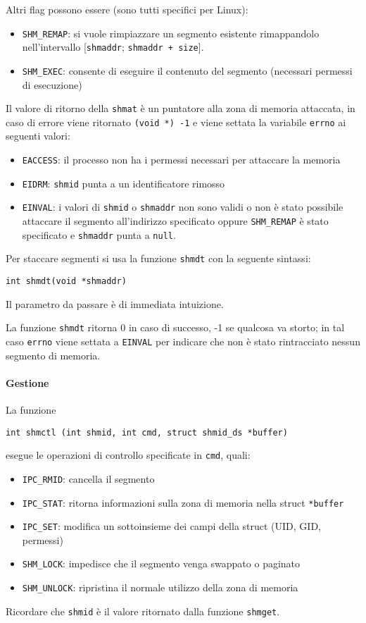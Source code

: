 \documentclass[a4paper, 10pt]{article}
\begin{document}
Altri flag possono essere (sono tutti specifici per Linux):
\begin{itemize}
\item \verb|SHM_REMAP|: si vuole rimpiazzare un segmento esistente rimappandolo nell'intervallo [\verb|shmaddr|; \verb|shmaddr + size|].
\item \verb|SHM_EXEC|: consente di eseguire il contenuto del segmento (necessari permessi di esecuzione)
\end{itemize}

Il valore di ritorno della \verb|shmat| è un puntatore alla zona di memoria attaccata, in caso di errore viene ritornato \verb|(void *) -1| e viene settata la variabile \verb|errno| ai seguenti valori:
\begin{itemize}
\item \verb|EACCESS|: il processo non ha i permessi necessari per attaccare la memoria
\item \verb|EIDRM|: \verb|shmid| punta a un identificatore rimosso
\item \verb|EINVAL|: i valori di \verb|shmid| o \verb|shmaddr| non sono validi o non è stato possibile attaccare il segmento all'indirizzo specificato oppure \verb|SHM_REMAP| è stato specificato e \verb|shmaddr| punta a \verb|null|.
\end{itemize}

Per staccare segmenti si usa la funzione \verb|shmdt| con la seguente sintassi:
\begin{verbatim}
int shmdt(void *shmaddr)
\end{verbatim}
Il parametro da passare è di immediata intuizione.

La funzione \verb|shmdt| ritorna 0 in caso di successo, -1 se qualcosa va storto; in tal caso \verb|errno| viene settata a \verb|EINVAL| per indicare che non è stato rintracciato nessun segmento di memoria.

\paragraph{Gestione}
La funzione
\begin{verbatim}
int shmctl (int shmid, int cmd, struct shmid_ds *buffer)
\end{verbatim}
esegue le operazioni di controllo specificate in \verb|cmd|, quali:
\begin{itemize}
\item \verb|IPC_RMID|: cancella il segmento
\item \verb|IPC_STAT|: ritorna informazioni sulla zona di memoria nella struct \verb|*buffer|
\item \verb|IPC_SET|: modifica un sottoinsieme dei campi della struct (UID, GID, permessi)
\item \verb|SHM_LOCK|: impedisce che il segmento venga swappato o paginato
\item \verb|SHM_UNLOCK|: ripristina il normale utilizzo della zona di memoria
\end{itemize}
Ricordare che \verb|shmid| è il valore ritornato dalla funzione \verb|shmget|. \\
\end{document}
